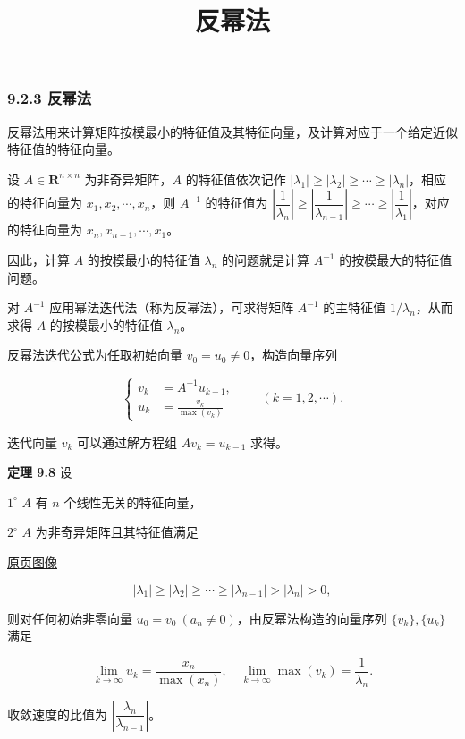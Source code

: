 \documentclass[
  10pt,
  fontset=fandol]{ctexart}
\title{反幂法}
\author{}
\date{}
\begin{document}
\maketitle

\subsubsection{9.2.3 反幂法}\label{ux53cdux5e42ux6cd5}

反幂法用来计算矩阵按模最小的特征值及其特征向量，及计算对应于一个给定近似特征值的特征向量。

设 \(A\in\mathbf R^{n\times n}\) 为非奇异矩阵，\(A\) 的特征值依次记作 \(|\lambda_1|\geq|\lambda_2|\geq\cdots\geq|\lambda_n|\)，相应的特征向量为 \(x_1,x_2,\cdots,x_n\)，则 \(A^{-1}\) 的特征值为 \(\left|\dfrac1{\lambda_n}\right|\geq\left|\dfrac1{\lambda_{n-1}}\right|\geq\cdots\geq\left|\dfrac1{\lambda_1}\right|\)，对应的特征向量为 \(x_n,x_{n-1},\cdots,x_1\)。

因此，计算 \(A\) 的按模最小的特征值 \(\lambda_n\) 的问题就是计算 \(A^{-1}\) 的按模最大的特征值问题。

对 \(A^{-1}\) 应用幂法迭代法（称为反幂法），可求得矩阵 \(A^{-1}\) 的主特征值 \(1/\lambda_n\)，从而求得 \(A\) 的按模最小的特征值 \(\lambda_n\)。

反幂法迭代公式为任取初始向量 \(v_0=u_0\ne0\)，构造向量序列

\[
\left\{
\begin{aligned}
v_k&=A^{-1}u_{k-1},\\
u_k&=\frac{v_k}{\max(v_k)}
\end{aligned}
\right.\qquad(k=1,2,\cdots).
\]

迭代向量 \(v_k\) 可以通过解方程组 \(Av_k=u_{k-1}\) 求得。

\textbf{定理 9.8} 设

\(1^\circ\) \(A\) 有 \(n\) 个线性无关的特征向量，

\(2^\circ\) \(A\) 为非奇异矩阵且其特征值满足

\href{../../source-images/pdf-241.jpeg}{原页图像}

\[
|\lambda_1|\geq|\lambda_2|\geq\cdots\geq|\lambda_{n-1}|>|\lambda_n|>0,
\]

则对任何初始非零向量 \(u_0=v_0\ (a_n\ne0)\)，由反幂法构造的向量序列 \(\{v_k\},\{u_k\}\) 满足

\[
\lim_{k\to\infty}u_k=\frac{x_n}{\max(x_n)},\quad\lim_{k\to\infty}\max(v_k)=\frac1{\lambda_n}.
\]

收敛速度的比值为 \(\left|\dfrac{\lambda_n}{\lambda_{n-1}}\right|\)。
\end{document}
